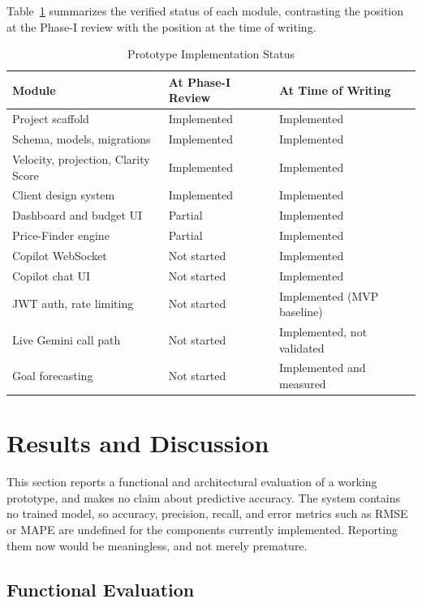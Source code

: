 \documentclass[conference]{IEEEtran}
\begin{document}
Table~\ref{tab:status} summarizes the verified status of each module, contrasting the position at the Phase-I review with the position at the time of writing.

\begin{table}[!t]
\centering
\caption{Prototype Implementation Status}
\label{tab:status}
\footnotesize
\renewcommand{\arraystretch}{1.3}
\begin{tabular}{|p{3.6cm}|p{2.0cm}|p{1.6cm}|}
\hline
\textbf{Module} & \textbf{At Phase-I Review} & \textbf{At Time of Writing} \\
\hline
Project scaffold & Implemented & Implemented \\
\hline
Schema, models, migrations & Implemented & Implemented \\
\hline
Velocity, projection, Clarity Score & Implemented & Implemented \\
\hline
Client design system & Implemented & Implemented \\
\hline
Dashboard and budget UI & Partial & Implemented \\
\hline
Price-Finder engine & Partial & Implemented \\
\hline
Copilot WebSocket & Not started & Implemented \\
\hline
Copilot chat UI & Not started & Implemented \\
\hline
JWT auth, rate limiting & Not started & Implemented (MVP baseline) \\
\hline
Live Gemini call path & Not started & Implemented, not validated \\
\hline
Goal forecasting & Not started & Implemented and measured \\
\hline
\end{tabular}
\end{table}

\section{Results and Discussion}

This section reports a functional and architectural evaluation of a working prototype, and makes no claim about predictive accuracy. The system contains no trained model, so accuracy, precision, recall, and error metrics such as RMSE or MAPE are undefined for the components currently implemented. Reporting them now would be meaningless, and not merely premature.

\subsection{Functional Evaluation}
\end{document}
